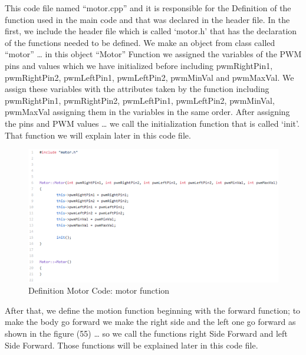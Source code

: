 This code file named “motor.cpp” and it is responsible for the Definition of the function used in the main code and that was declared in the header file. In the first, we include the header file which is called ‘motor.h’ that has the declaration of the functions needed to be defined. We make an object from class called “motor” … in this object “Motor” Function we assigned the variables of the PWM pins and values which we have initialized before including pwmRightPin1, pwmRightPin2, pwmLeftPin1, pwmLeftPin2, pwmMinVal and pwmMaxVal. We assign these variables with the attributes taken by the function including pwmRightPin1, pwmRightPin2, pwmLeftPin1, pwmLeftPin2, pwmMinVal, pwmMaxVal assigning them in the variables in the same order. After assigning the pins and PWM values … we call the initialization function that is called ‘init’. That function we will explain later in this code file.

\begin{figure}[h]
    \centering
    \includegraphics{figures/53.png}
    \caption{Definition Motor Code: motor function}
    \label{fig:my_label}
\end{figure}

\newpage

After that, we define the motion function beginning with the forward function; to make the body go forward we make the right side and the left one go forward as shown in the figure (55) … so we call the functions right Side Forward and left Side Forward. Those functions will be explained later in this code file.

